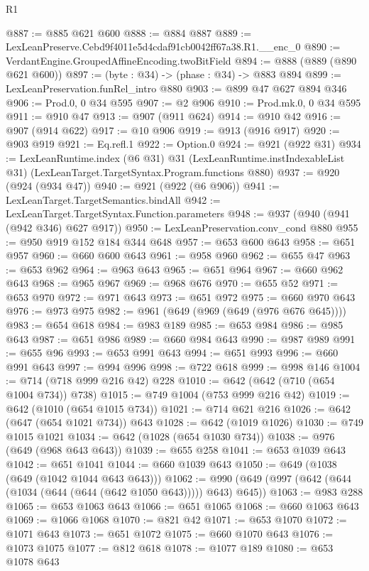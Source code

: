 \begin{lexlean}{R1}
\begin{coremodule}
@887 := @885 @621 @600
@888 := @884 @887
@889 := LexLeanPreserve.Cebd9f4011e5d4cdaf91cb0042ff67a38.R1.__enc_0
@890 := VerdantEngine.GroupedAffineEncoding.twoBitField
@894 := @888 (@889 (@890 @621 @600))
@897 := (byte : @34) -> (phase : @34) -> @883 @894
@899 := LexLeanPreservation.funRel_intro @880
@903 := @899 @47 @627 @894 @346
@906 := Prod.{0, 0} @34 @595
@907 := @2 @906
@910 := Prod.mk.{0, 0} @34 @595
@911 := @910 @47
@913 := @907 (@911 @624)
@914 := @910 @42
@916 := @907 (@914 @622)
@917 := @10 @906
@919 := @913 (@916 @917)
@920 := @903 @919
@921 := Eq.refl.{1}
@922 := Option.{0}
@924 := @921 (@922 @31)
@934 := LexLeanRuntime.index
    (@6 @31)
    @31
    (LexLeanRuntime.instIndexableList @31)
    (LexLeanTarget.TargetSyntax.Program.functions @880)
@937 := @920 (@924 (@934 @47))
@940 := @921 (@922 (@6 @906))
@941 := LexLeanTarget.TargetSemantics.bindAll
@942 := LexLeanTarget.TargetSyntax.Function.parameters
@948 := @937 (@940 (@941 (@942 @346) @627 @917))
@950 := LexLeanPreservation.conv_cond @880
@955 := @950 @919 @152 @184 @344 @648
@957 := @653 @600 @643
@958 := @651 @957
@960 := @660 @600 @643
@961 := @958 @960
@962 := @655 @47
@963 := @653 @962
@964 := @963 @643
@965 := @651 @964
@967 := @660 @962 @643
@968 := @965 @967
@969 := @968 @676
@970 := @655 @52
@971 := @653 @970
@972 := @971 @643
@973 := @651 @972
@975 := @660 @970 @643
@976 := @973 @975
@982 := @961 (@649 (@969 (@649 (@976 @676 @645))))
@983 := @654 @618
@984 := @983 @189
@985 := @653 @984
@986 := @985 @643
@987 := @651 @986
@989 := @660 @984 @643
@990 := @987 @989
@991 := @655 @96
@993 := @653 @991 @643
@994 := @651 @993
@996 := @660 @991 @643
@997 := @994 @996
@998 := @722 @618
@999 := @998 @146
@1004 := @714 (@718 @999 @216 @42) @228
@1010 := @642 (@642 (@710 (@654 @1004 @734)) @738)
@1015 := @749 @1004 (@753 @999 @216 @42)
@1019 := @642 (@1010 (@654 @1015 @734))
@1021 := @714 @621 @216
@1026 := @642 (@647 (@654 @1021 @734)) @643
@1028 := @642 (@1019 @1026)
@1030 := @749 @1015 @1021
@1034 := @642 (@1028 (@654 @1030 @734))
@1038 := @976 (@649 (@968 @643 @643))
@1039 := @655 @258
@1041 := @653 @1039 @643
@1042 := @651 @1041
@1044 := @660 @1039 @643
@1050 := @649 (@1038 (@649 (@1042 @1044 @643 @643)))
@1062 := @990 (@649 (@997 (@642 (@644 (@1034 (@644 (@644 (@642 @1050 @643))))) @643) @645))
@1063 := @983 @288
@1065 := @653 @1063 @643
@1066 := @651 @1065
@1068 := @660 @1063 @643
@1069 := @1066 @1068
@1070 := @821 @42
@1071 := @653 @1070
@1072 := @1071 @643
@1073 := @651 @1072
@1075 := @660 @1070 @643
@1076 := @1073 @1075
@1077 := @812 @618
@1078 := @1077 @189
@1080 := @653 @1078 @643

\end{coremodule}
\end{lexlean}

